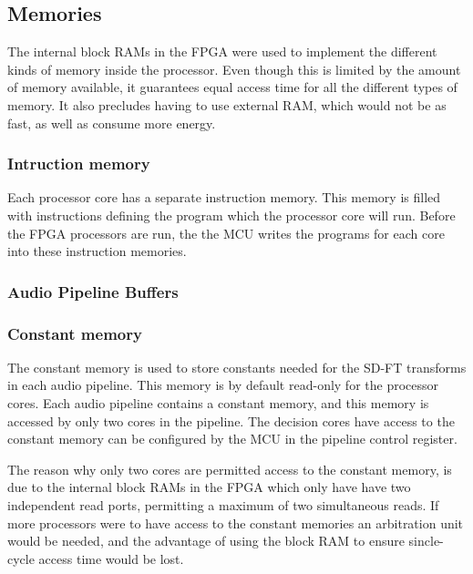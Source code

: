 \subsection{Memories}\label{subsec:fpga-memories}

The internal block RAMs in the FPGA were used to implement the different kinds
of memory inside the processor. Even though this is limited by the amount of
memory available, it guarantees equal access time for all the different types
of memory. It also precludes having to use external RAM, which would not be as
fast, as well as consume more energy.

\subsubsection{Intruction memory}

Each processor core has a separate instruction memory. This memory is filled
with instructions defining the program which the processor core will run. Before
the FPGA processors are run, the the MCU writes the programs for each core into
these instruction memories.

\subsubsection{Audio Pipeline Buffers}

\subsubsection{Constant memory}

The constant memory is used to store constants needed for the SD-FT transforms in each audio pipeline. This memory is by default
read-only for the processor cores. Each audio pipeline contains a constant
memory, and this memory is accessed by only two cores in the pipeline. The
decision cores have access to the constant memory can be configured by the MCU
in the pipeline control register.

The reason why only two cores are permitted access to the constant memory, is
due to the internal block RAMs in the FPGA which only have have two independent
read ports, permitting a maximum of two simultaneous reads. If more processors
were to have access to the constant memories an arbitration unit would be
needed, and the advantage of using the block RAM to ensure sincle-cycle access
time would be lost.
